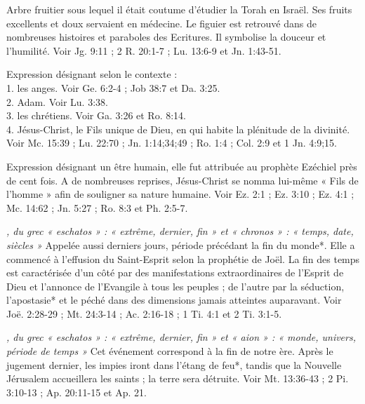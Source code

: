 \begin{multicols}{2}
\textit{}\newline
Arbre fruitier sous lequel il était coutume d'étudier la Torah en Israël. Ses fruits excellents et doux servaient en médecine. Le figuier est retrouvé dans de nombreuses histoires et paraboles des Ecritures. Il symbolise la douceur et l'humilité. Voir Jg. 9:11 ; 2 R. 20:1-7 ; Lu. 13:6-9 et Jn. 1:43-51.

\textit{}\newline
Expression désignant selon le contexte :
\\1. les anges. Voir Ge. 6:2-4 ; Job 38:7 et Da. 3:25.
\\2. Adam. Voir Lu. 3:38.
\\3. les chrétiens. Voir Ga. 3:26 et Ro. 8:14.
\\4. Jésus-Christ, le Fils unique de Dieu, en qui habite la plénitude de la divinité. Voir Mc. 15:39 ; Lu. 22:70 ; Jn. 1:14;34;49 ; Ro. 1:4 ; Col. 2:9 et 1 Jn. 4:9;15.

\textit{}\newline
Expression désignant un être humain, elle fut attribuée au prophète Ezéchiel près de cent fois. A de nombreuses reprises, Jésus-Christ se nomma lui-même « Fils de l'homme » afin de souligner sa nature humaine. Voir Ez. 2:1 ; Ez. 3:10 ; Ez. 4:1 ; Mc. 14:62 ; Jn. 5:27 ; Ro. 8:3 et Ph. 2:5-7.

\textit{, du grec « eschatos » : « extrême, dernier, fin » et « chronos » : « temps, date, siècles »}\newline
Appelée aussi derniers jours, période précédant la fin du monde*. Elle a commencé à l'effusion du Saint-Esprit selon la prophétie de Joël. La fin des temps est caractérisée d'un côté par des manifestations extraordinaires de l'Esprit de Dieu et l'annonce de l'Evangile à tous les peuples ; de l'autre par la séduction, l'apostasie* et le péché dans des dimensions jamais atteintes auparavant. Voir Joë. 2:28-29 ; Mt. 24:3-14 ; Ac. 2:16-18 ; 1 Ti. 4:1 et 2 Ti. 3:1-5.

\textit{, du grec « eschatos » : « extrême, dernier, fin » et « aion » : « monde, univers, période de temps »}\newline
Cet événement correspond à la fin de notre ère. Après le jugement dernier, les impies iront dans l'étang de feu*, tandis que la Nouvelle Jérusalem accueillera les saints ; la terre sera détruite. Voir Mt. 13:36-43 ; 2 Pi. 3:10-13 ; Ap. 20:11-15 et Ap. 21.


\end{multicols}

